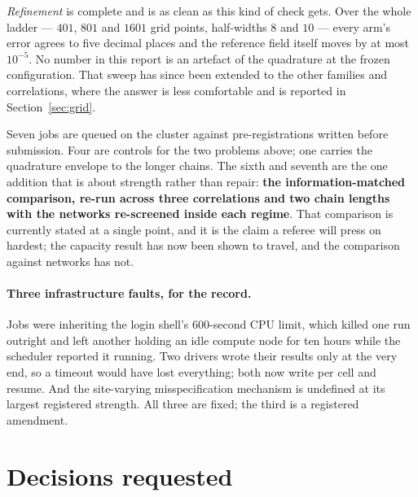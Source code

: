 \documentclass[11pt,a4paper]{article}
\begin{document}
\emph{Refinement} is complete and is as clean as this kind of check gets. Over the whole ladder ---
$401$, $801$ and $1601$ grid points, half-widths $8$ and $10$ --- every arm's error agrees to five
decimal places and the reference field itself moves by at most $10^{-5}$. No number in this report
is an artefact of the quadrature at the frozen configuration. That sweep has since been extended to
the other families and correlations, where the answer is less comfortable and is reported in
Section~\ref{sec:grid}.

Seven jobs are queued on the cluster against pre-registrations written before submission. Four are
controls for the two problems above; one carries the quadrature envelope to the longer chains. The
sixth and seventh are the one addition that is about strength rather than repair: \textbf{the
information-matched comparison, re-run across three correlations and two chain lengths with the
networks re-screened inside each regime}. That comparison is currently stated at a single point,
and it is the claim a referee will press on hardest; the capacity result has now been shown to
travel, and the comparison against networks has not.

\paragraph{Three infrastructure faults, for the record.}
Jobs were inheriting the login shell's $600$-second CPU limit, which killed one run outright and
left another holding an idle compute node for ten hours while the scheduler reported it running.
Two drivers wrote their results only at the very end, so a timeout would have lost everything; both
now write per cell and resume. And the site-varying misspecification mechanism is undefined at its
largest registered strength. All three are fixed; the third is a registered amendment.

\section{Decisions requested}\label{sec:ask}
\end{document}
